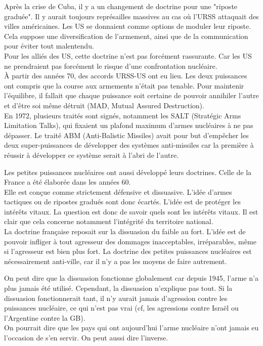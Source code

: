 \documentclass[10pt, a4paper, openany]{book}
\begin{document}
Après la crise de Cuba, il y a un changement de doctrine pour une "riposte graduée". Il y aurait toujours représailles massives au cas où l'URSS attaquait des villes américaines. Les US se donnaient comme options de moduler leur riposte. Cela suppose une diversification de l'armement, ainsi que de la communication pour éviter tout malentendu. \\
Pour les alliés des US, cette doctrine n'est pas forcément rassurante. Car les US ne prendraient pas forcément le risque d'une confrontation nucléaire. \\
À partir des années 70, des accords URSS-US ont eu lieu. Les deux puissances ont compris que la course aux armements n'était pas tenable. Pour maintenir l'équilibre, il fallait que chaque puissance soit certaine de pouvoir annihiler l'autre et d'être soi même détruit (MAD, Mutual Assured Destruction). \\
En 1972, plusieurs traités sont signés, notamment les SALT (Stratégic Arms Limitation Talks), qui fixaient un plafond maximum d'armes nucléaires à ne pas dépasser. Le traité ABM (Anti-Balistic Missiles) avait pour but d'empêcher les deux super-puissances de développer des systèmes anti-missiles car la première à réussir à développer ce système serait à l'abri de l'autre. 


Les petites puissances nucléaires ont aussi développé leurs doctrines. Celle de la France a été élaborée dans les années 60. \\
Elle est conçue comme strictement défensive et dissuasive. L'idée d'armes tactiques ou de ripostes gradués sont donc écartés. L'idée est de protéger les intérêts vitaux. La question est donc de savoir quels sont les intérêts vitaux. Il est clair que cela concerne notamment l'intégrité du territoire national. \\
La doctrine française reposait sur la dissuasion du faible au fort. L'idée est de pouvoir infliger à tout agresseur des dommages inacceptables, irréparables, même si l'agresseur est bien plus fort. La doctrine des petites puissances nucléaires est nécessairement anti-ville, car il n'y a pas les moyens de faire autrement. 


On peut dire que la dissuasion fonctionne globalement car depuis 1945, l'arme n'a plus jamais été utilisé. Cependant, la dissuasion n'explique pas tout. Si la dissuasion fonctionnerait tant, il n'y aurait jamais d'agression contre les puissances nucléaire, ce qui n'est pas vrai (cf, les agressions contre Israël ou l'Argentine contre la GB). \\
On pourrait dire que les pays qui ont aujourd'hui l'arme nucléaire n'ont jamais eu l'occasion de s'en servir. On peut aussi dire l'inverse. 
\end{document}

